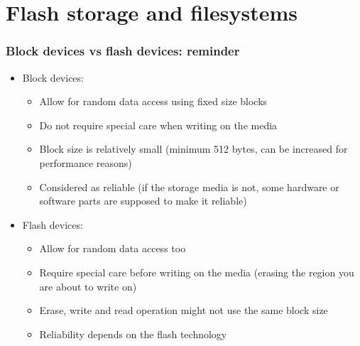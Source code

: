 \section{Flash storage and filesystems}

\begin{frame}
  \frametitle{Block devices vs flash devices: reminder}
  \begin{itemize}
  \item Block devices:
    \begin{itemize}
    \item Allow for random data access using fixed size blocks
    \item Do not require special care when writing on the media
    \item Block size is relatively small (minimum 512 bytes, can be
      increased for performance reasons)
    \item Considered as reliable (if the storage media is not, some
      hardware or software parts are supposed to make it reliable)
    \end{itemize}
  \item Flash devices:
    \begin{itemize}
    \item Allow for random data access too
    \item Require special care before writing on the media (erasing
      the region you are about to write on)
    \item Erase, write and read operation might not use the same block
      size
    \item Reliability depends on the flash technology
    \end{itemize}
  \end{itemize}
\end{frame}

